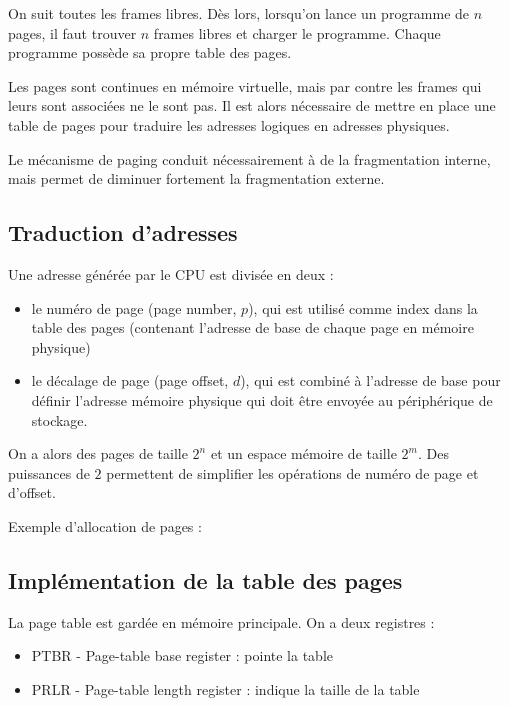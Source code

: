 On suit toutes les frames libres. Dès lors, lorsqu'on lance un programme de $n$ pages, il faut trouver $n$ frames libres et charger le programme. Chaque programme possède sa propre table des pages.

Les pages sont continues en mémoire virtuelle, mais par contre les frames qui leurs sont associées ne le sont pas. Il est alors nécessaire de mettre en place une table de pages pour traduire les adresses logiques en adresses physiques.

Le mécanisme de paging conduit nécessairement à de la fragmentation interne, mais permet de diminuer fortement la fragmentation externe.

	\subsection{Traduction d'adresses}
	
	Une adresse générée par le CPU est divisée en deux :
	
	\begin{itemize}
		\item le numéro de page (page number, $p$), qui est utilisé comme index dans la table des pages (contenant l'adresse de base de chaque page en mémoire physique)
		\item le décalage de page (page offset, $d$), qui est combiné à l'adresse de base pour définir l'adresse mémoire physique qui doit être envoyée au périphérique de stockage.
	\end{itemize}
	
	
	On a alors des pages de taille $2^n$ et un espace mémoire de taille $2^m$. Des puissances de $2$ permettent de simplifier les opérations de numéro de page et d'offset.
	
	
	Exemple d'allocation de pages :
	
	
	\subsection{Implémentation de la table des pages}
	
	La page table est gardée en mémoire principale. On a deux registres :
	
	\begin{itemize}
		\item PTBR - Page-table base register : pointe la table
		\item PRLR - Page-table length register : indique la taille de la table
	\end{itemize}
	

